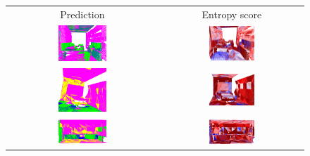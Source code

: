     \begin{figure}[h!]
        \centering
        \begin{tabular}{cc}
            Prediction & Entropy score \\
            \includegraphics[width=0.33\textwidth, height=0.18\textheight]{images/seg_output/s3dis_DE/S3DIS_1_Pred.png}& 
            \includegraphics[width=0.33\textwidth, height=0.18\textheight]{images/seg_output/s3dis_DE/S3DIS_1_Entropy.png}\\

            \includegraphics[width=0.33\textwidth, height=0.18\textheight]{images/seg_output/s3dis_DE/S3DIS_2_Pred.png}& 
            \includegraphics[width=0.33\textwidth, height=0.18\textheight]{images/seg_output/s3dis_DE/S3DIS_2_Entropy.png}\\

            \includegraphics[width=0.33\textwidth, height=0.18\textheight]{images/seg_output/s3dis_DE/S3DIS_3_Pred.png}& 
            \includegraphics[width=0.33\textwidth, height=0.18\textheight]{images/seg_output/s3dis_DE/S3DIS_3_Entropy.png}\\


\end{tabular}
\end{figure}
